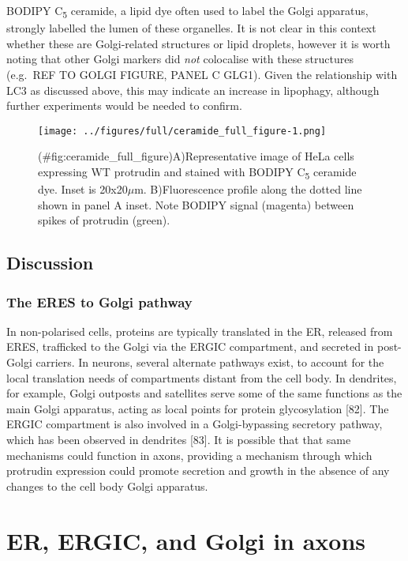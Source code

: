 \documentclass[
  12pt,
  a4paper,
]{book}
\begin{document}
BODIPY C\textsubscript{5} ceramide, a lipid dye often used to label the Golgi apparatus, strongly labelled the lumen of these organelles. It is not clear in this context whether these are Golgi-related structures or lipid droplets, however it is worth noting that other Golgi markers did \emph{not} colocalise with these structures (e.g.~REF TO GOLGI FIGURE, PANEL C GLG1). Given the relationship with LC3 as discussed above, this may indicate an increase in lipophagy, although further experiments would be needed to confirm.

\begin{figure}
\centering
\texttt{[image: ../figures/full/ceramide\_full\_figure-1.png]}
\caption{(\#fig:ceramide\_full\_figure)A)Representative image of HeLa cells expressing WT protrudin and stained with BODIPY C\textsubscript{5} ceramide dye. Inset is 20x20\(\mu\)m. B)Fluorescence profile along the dotted line shown in panel A inset. Note BODIPY signal (magenta) between spikes of protrudin (green).}
\end{figure}

\hypertarget{discussion-1}{%
\section{Discussion}\label{discussion-1}}

\hypertarget{the-eres-to-golgi-pathway}{%
\subsection{The ERES to Golgi pathway}\label{the-eres-to-golgi-pathway}}

In non-polarised cells, proteins are typically translated in the ER, released from ERES, trafficked to the Golgi via the ERGIC compartment, and secreted in post-Golgi carriers. In neurons, several alternate pathways exist, to account for the local translation needs of compartments distant from the cell body. In dendrites, for example, Golgi outposts and satellites serve some of the same functions as the main Golgi apparatus, acting as local points for protein glycosylation {[}82{]}. The ERGIC compartment is also involved in a Golgi-bypassing secretory pathway, which has been observed in dendrites {[}83{]}. It is possible that that same mechanisms could function in axons, providing a mechanism through which protrudin expression could promote secretion and growth in the absence of any changes to the cell body Golgi apparatus.

\hypertarget{er-ergic-and-golgi-in-axons}{%
\chapter{ER, ERGIC, and Golgi in axons}\label{er-ergic-and-golgi-in-axons}}
\end{document}
